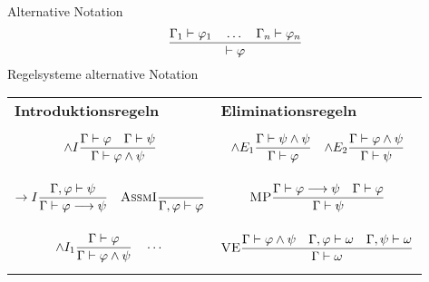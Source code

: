 \documentclass{Zusammenfassung}
\newcommand{\typeRule}[3]{ \textrm{\textsc{#1}}\frac{#2}{#3}}
\begin{document}
Alternative Notation
\begin{equation*}
    \typeRule{}{
    \Gamma_1 \vdash \varphi_1\quad\dots\quad\Gamma_n\vdash\varphi_n
    }{
    \vdash \varphi
    }
\end{equation*}
Regelsysteme alternative Notation
\begin{table}[H]
    \centering
    \begin{tabularx}{\textwidth}{XX}
        \centerline{\textbf{Introduktionsregeln}} &\centerline{\textbf{Eliminationsregeln}}\\
        \begin{equation*}\typeRule{$\wedge{}I$}{\Gamma\vdash\varphi\quad\Gamma\vdash\psi}{\Gamma\vdash\varphi\wedge\psi}\end{equation*}&\begin{equation*}\typeRule{$\wedge{}E_1$}{\Gamma\vdash\psi\wedge\psi}{\Gamma\vdash\varphi}\quad\typeRule{$\wedge{}E_2$}{\Gamma\vdash\varphi\wedge\psi}{\Gamma\vdash\psi}\end{equation*}\\
        \begin{equation*}\typeRule{$\rightarrow{}I$}{\Gamma,\varphi\vdash\psi}{\Gamma\vdash\varphi\longrightarrow\psi}\quad\typeRule{AssmI}{}{\Gamma,\varphi\vdash\varphi}\end{equation*}&\begin{equation*}\typeRule{MP}{\Gamma\vdash\varphi\longrightarrow\psi\quad\Gamma\vdash\varphi}{\Gamma\vdash\psi}\end{equation*}\\
        \begin{equation*}\typeRule{$\wedge{}I_1$}{\Gamma\vdash\varphi}{\Gamma\vdash\varphi\wedge\psi}\quad\cdots\end{equation*}&\begin{equation*}\typeRule{VE}{\Gamma\vdash\varphi\wedge\psi\quad\Gamma,\varphi\vdash\omega\quad\Gamma,\psi\vdash\omega}{\Gamma\vdash\omega}\end{equation*}\\
    \end{tabularx}\label{tab:table5}
\end{table}
\end{document}
